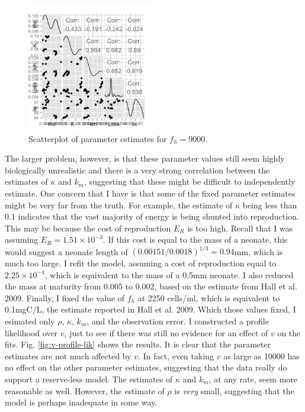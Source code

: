 \documentclass[12pt,reqno,final,pdftex]{amsart}\usepackage[]{graphicx}\usepackage[]{color}
\newenvironment{knitrout}{}{} %
\theoremstyle{plain}
\numberwithin{equation}{part}
\begin{document}
\begin{knitrout}\scriptsize
{}\color{fgcolor}\begin{figure}

\includegraphics[width=0.5\textwidth]{figure/fh9000-1} \hfill{}

\caption[Scatterplot of parameter estimates for ]{Scatterplot of parameter estimates for $f_h=9000$.}\label{fig:fh9000}
\end{figure}


\end{knitrout}

The larger problem, however, is that these parameter values still seem highly biologically unrealistic and there is a very strong correlation between the estimates of $\kappa$ and $k_m$, suggesting that these might be difficult to independently estimate.
One concern that I have is that some of the fixed parameter estimates might be very far from the truth.
For example, the estimate of $\kappa$ being less than 0.1 indicates that the vast majority of energy is being shunted into reproduction.
This may be because the cost of reproduction $E_R$ is too high.
Recall that I was assuming $E_R=1.51 \times 10^{-3}$.
If this cost is equal to the mass of a neonate, this would suggest a neonate length of $(0.00151/0.0018)^{1/3}=0.94$mm, which is much too large.
I refit the model, assuming a cost of reproduction equal to $2.25 \times 10^{-4}$, which is equivalent to the mass of a 0.5mm neonate.
I also reduced the mass at maturity from 0.005 to 0.002, based on the estimate from Hall et al. 2009.
Finally, I fixed the value of $f_h$ at 2250 cells/ml, which is equivalent to 0.1mgC/L, the estimate reported in Hall et al. 2009.
Which those values fixed, I esimated only $\rho$, $\kappa$, $k_m$, and the observation error.
I constructed a profile likelihood over $v$, just to see if there was still no evidence for an effect of $v$ on the fits.
Fig. \ref{fig:v-profile-lik} shows the results.
It is clear that the parameter estimates are not much affected by $v$.
In fact, even taking $v$ as large as 10000 has no effect on the other parameter estimates, suggesting that the data really do support a reserve-less model.
The estimates of $\kappa$ and $k_m$, at any rate, seem more reasonable as well.
However, the estimate of $\rho$ is \emph{very} small, suggesting that the model is perhaps inadequate in some way.
\end{document}
